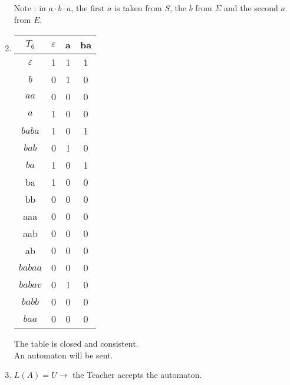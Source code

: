 \begin{enumerate}
\begin{center}
\begin{minipage}{0.5\textwidth}
            Note : in $a \cdot b \cdot a$, the first $a$ is taken from $S$, the $b$ from $\Sigma$ and the second $a$ from $E$.
          \end{minipage}
        \end{center}
  \item \quad
        \begin{center}
          \begin{tabular}{c || c | c | c }
            $T_6$         & $\varepsilon$ & a & ba \\ [0.5ex]
            \hline\hline
            $\varepsilon$ & 1             & 1 & 1  \\
            $b$           & 0             & 1 & 0  \\
            $aa$          & 0             & 0 & 0  \\
            $a$           & 1             & 0 & 0  \\
            $baba$        & 1             & 0 & 1  \\
            $bab$         & 0             & 1 & 0  \\
            $ba$          & 1             & 0 & 1  \\
            \hline \hline
            ba            & 1             & 0 & 0  \\
            bb            & 0             & 0 & 0  \\
            aaa           & 0             & 0 & 0  \\
            aab           & 0             & 0 & 0  \\
            ab            & 0             & 0 & 0  \\
            $babaa$       & 0             & 0 & 0  \\
            $babav$       & 0             & 1 & 0  \\
            $babb$        & 0             & 0 & 0  \\
            $baa$         & 0             & 0 & 0  \\
          \end{tabular}
          \quad
          \begin{minipage}{0.5\textwidth}
            The table is closed and consistent.\\
            An automaton will be sent.
          \end{minipage}
        \end{center}
  \item \quad
        \begin{center}
          
          \quad
          \begin{minipage}{0.5\textwidth}
            $L(A) = U \rightarrow$ the Teacher accepts the automaton.
          \end{minipage}
        \end{center}
\end{enumerate}